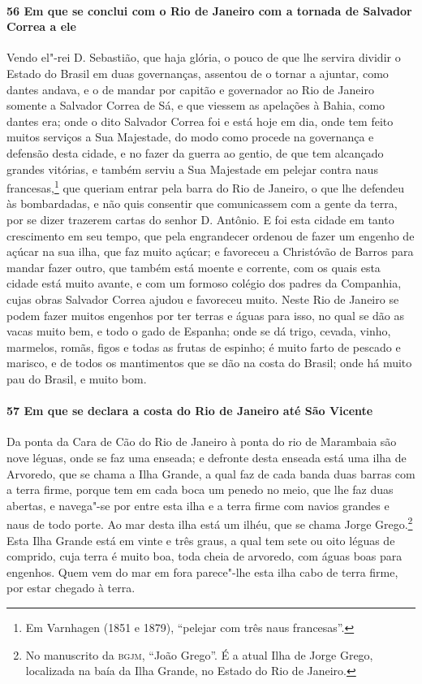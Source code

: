 \paragraph{56 Em que se conclui com o Rio de Janeiro com a tornada de Salvador Correa a
ele}

Vendo el"-rei D. Sebastião, que haja glória, o pouco de que lhe servira dividir o Estado do
Brasil em duas governanças, assentou de o tornar a ajuntar, como dantes andava, e o de
mandar por capitão e governador ao Rio de Janeiro somente a Salvador Correa de Sá, e que
viessem as apelações à Bahia, como dantes era; onde o dito Salvador Correa foi e está hoje
em dia, onde tem feito muitos serviços a Sua Majestade, do modo como procede na governança
e defensão desta cidade, e no fazer da guerra ao gentio, de que tem alcançado grandes
vitórias, e também serviu a Sua Majestade em pelejar contra naus francesas,\footnote{ Em
Varnhagen (1851 e 1879), ``pelejar com três naus francesas''.} que queriam entrar pela
barra do Rio de Janeiro, o que lhe defendeu às bombardadas, e não quis consentir que
comunicassem com a gente da terra, por se dizer trazerem cartas do senhor D. Antônio. E
foi esta cidade em tanto crescimento em seu tempo, que pela engrandecer ordenou de fazer
um engenho de açúcar na sua ilha, que faz muito açúcar; e favoreceu a Christóvão de Barros
para mandar fazer outro, que também está moente e corrente, com os quais esta cidade está
muito avante, e com um formoso colégio dos padres da Companhia, cujas obras Salvador
Correa ajudou e favoreceu muito. Neste Rio de Janeiro se podem fazer muitos engenhos por
ter terras e águas para isso, no qual se dão as vacas muito bem, e todo o gado de Espanha;
onde se dá trigo, cevada, vinho, marmelos, romãs, figos e todas as frutas de espinho; é
muito farto de pescado e marisco, e de todos os mantimentos que se dão na costa do Brasil;
onde há muito pau do Brasil, e muito bom.

\paragraph{57 Em que se declara a costa do Rio de Janeiro até São Vicente}

Da ponta da Cara de Cão do Rio de Janeiro à ponta do rio de Marambaia são nove léguas,
onde se faz uma enseada; e defronte desta enseada está uma ilha de Arvoredo, que se chama
a Ilha Grande, a qual faz de cada banda duas barras com a terra firme, porque tem em cada
boca um penedo no meio, que lhe faz duas abertas, e navega"-se por entre esta ilha e a
terra firme com navios grandes e naus de todo porte. Ao mar desta ilha está um ilhéu, que
se chama Jorge Grego.\footnote{ No manuscrito da \textsc{bgjm}, ``João Grego''. É a atual
Ilha de Jorge Grego, localizada na baía da Ilha Grande, no Estado do Rio de Janeiro.}
Esta Ilha Grande está em vinte e três graus, a qual tem sete ou oito léguas de comprido,
cuja terra é muito boa, toda cheia de arvoredo, com águas boas para engenhos. Quem vem do
mar em fora parece"-lhe esta ilha cabo de terra firme, por estar chegado à terra.

